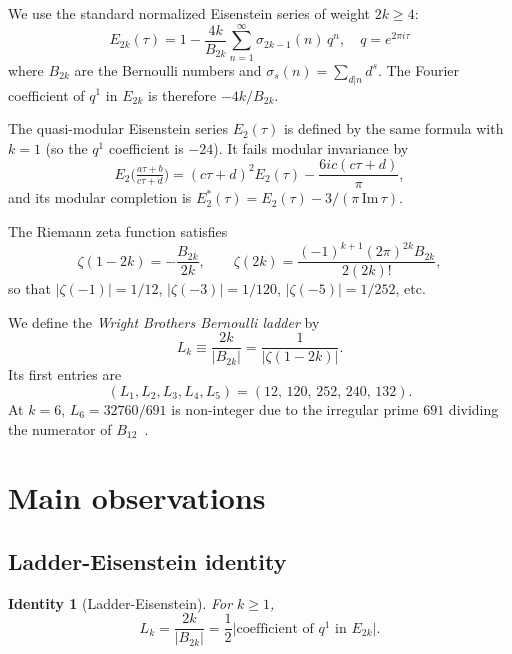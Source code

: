 \documentclass[11pt,a4paper]{article}
\newtheorem{identity}{Identity}
\begin{document}
We use the standard normalized Eisenstein series of weight $2k \geq 4$:
\begin{equation}
E_{2k}(\tau) = 1 - \frac{4k}{B_{2k}}\sum_{n=1}^\infty \sigma_{2k-1}(n)\,q^n,
\quad q = e^{2\pi i\tau}
\end{equation}
where $B_{2k}$ are the Bernoulli numbers and $\sigma_s(n) = \sum_{d|n}d^s$.
The Fourier coefficient of $q^1$ in $E_{2k}$ is therefore $-4k/B_{2k}$.

The quasi-modular Eisenstein series $E_2(\tau)$ is defined by the same
formula with $k=1$ (so the $q^1$ coefficient is $-24$). It fails
modular invariance by
\begin{equation}
E_2\bigl(\tfrac{a\tau+b}{c\tau+d}\bigr) = (c\tau+d)^2 E_2(\tau) - \frac{6ic(c\tau+d)}{\pi},
\end{equation}
and its modular completion is $E_2^*(\tau) = E_2(\tau) - 3/(\pi\,\mathrm{Im}\,\tau)$.

The Riemann zeta function satisfies
\begin{equation}
\zeta(1-2k) = -\frac{B_{2k}}{2k}, \qquad \zeta(2k) = \frac{(-1)^{k+1}(2\pi)^{2k}B_{2k}}{2(2k)!},
\end{equation}
so that $|\zeta(-1)| = 1/12$, $|\zeta(-3)| = 1/120$, $|\zeta(-5)| = 1/252$, etc.

We define the \emph{Wright Brothers Bernoulli ladder} by
\begin{equation}
L_k \equiv \frac{2k}{|B_{2k}|} = \frac{1}{|\zeta(1-2k)|}.
\end{equation}
Its first entries are
\begin{equation}
(L_1, L_2, L_3, L_4, L_5) = (12,\,120,\,252,\,240,\,132).
\end{equation}
At $k=6$, $L_6 = 32760/691$ is non-integer due to the irregular prime
$691$ dividing the numerator of $B_{12}$~\cite{Kummer1850}.

\section{Main observations}
\label{sec:main}

\subsection{Ladder-Eisenstein identity}

\begin{identity}[Ladder-Eisenstein]
\label{id:ladder}
For $k \geq 1$,
\begin{equation}
L_k = \frac{2k}{|B_{2k}|} = \frac{1}{2}\bigl|\text{coefficient of }q^1\text{ in }E_{2k}\bigr|.
\end{equation}
\end{identity}
\end{document}
